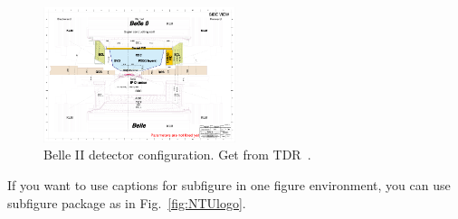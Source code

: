 \begin{figure}
\begin{center}
\includegraphics[width=0.5\textwidth]{figures/belle2detector.pdf}
  \caption[Belle II detector to be shown in List of Figure.]{Belle II detector configuration. Get from TDR~\cite{Abe:2010sj}.}
  \label{fig:belledetector}
\end{center}
\end{figure}

If you want to use captions for subfigure in one figure environment, you can use subfigure package as in Fig.~\ref{fig:NTUlogo}.


